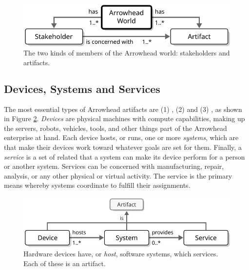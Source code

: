 \vspace*{1mm}

\begin{figure}[ht!]
  \centering
  \includegraphics[scale=0.9]{figures/world}
  \caption{
    The two kinds of members of the Arrowhead world: stakeholders and artifacts.
  }
  \label{fig:world}
\end{figure}

\vspace*{-3mm}

\subsection{Devices, Systems and Services}

The most essential types of Arrowhead artifacts are (1) , (2)  and (3) , as shown in Figure \ref{fig:device-system-service}.
\textit{Devices} are physical machines with compute capabilities, making up the servers, robots, vehicles, tools, and other things part of the Arrowhead enterprise at hand.
Each device hosts, or runs, one or more \textit{systems}, which are   that make their devices work toward whatever goals are set for them.
Finally, a \textit{service} is a set of related  that a system can make its device perform for a person or another system.
Services can be concerned with manufacturing, repair, analysis, or any other physical or virtual activity.
The service is the primary means whereby systems coordinate to fulfill their assignments.

\vspace*{1mm}

\begin{figure}[ht!]
  \centering
  \includegraphics[scale=0.9]{figures/device-system-service}
  \caption{
    Hardware devices have, or \textit{host}, software systems, which  services.
    Each of these is an artifact.
  }
  \label{fig:device-system-service}
\end{figure}

